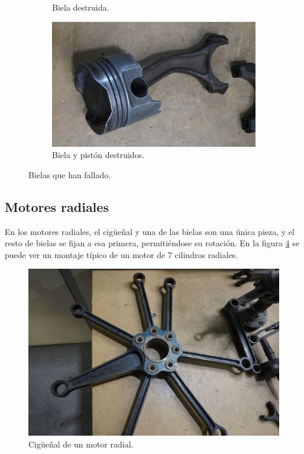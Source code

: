 \begin{figure}[H]
\begin{subfigure}[b]{0.45\textwidth}
		\caption{Biela destruida.}
		\label{fig:broken}
	\end{subfigure}
	\hfill
	\begin{subfigure}[b]{0.45\textwidth}
 		\centering
 		\includegraphics[width=\linewidth]{Figures/02/m4/damage.jpg}
 		\caption{Biela y pistón destruidos.}
		\label{fig:broken_w_p}
	\end{subfigure}    
	\caption{Bielas que han fallado.}
	\label{fig:broken_conrod}
\end{figure}

\subsection{Motores radiales} \label{ss:radial_conrod}

En los motores radiales, el cigüeñal y una de las bielas son una única pieza, y el resto de bielas se fijan a esa primera, permitiéndose su rotación. En la figura \ref{fig:conrod_radial} se puede ver un montaje típico de un motor de 7 cilindros radiales.

\begin{figure}[H]
	\centering
	\includegraphics[width=0.6\linewidth]{Figures/02/m4/cig_radial.jpg}
	\caption{Cigüeñal de un motor radial.}
	\label{fig:conrod_radial}
\end{figure}






